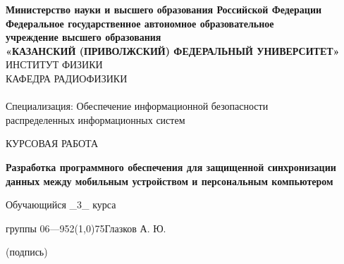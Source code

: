 \documentclass[a4paper]{article}
\begin{document}
\begin{titlepage}
	\newpage
	\begin{center}
		\textbf{\normalsize Министерство науки и высшего образования Российской Федерации
			\vspace{2pt}\\
			Федеральное государственное автономное образовательное
			\vspace{2pt}\\
			учреждение высшего образования
			\vspace{2pt}\\
		«КАЗАНСКИЙ (ПРИВОЛЖСКИЙ) ФЕДЕРАЛЬНЫЙ УНИВЕРСИТЕТ»\\}
		\vspace{26pt}
		\large{ИНСТИТУТ ФИЗИКИ}
		\vspace{2pt}\\
		\large{КАФЕДРА РАДИОФИЗИКИ}\\
		
		\vspace{12pt}{
		Направление подготовки:\\
		10.05.03 – Информационная безопасность автоматизированных систем}
		\vspace{14pt}\\
		
		Специализация: Обеспечение информационной безопасности
		\vspace{-2pt}\\
		распределенных информационных систем
		
		\vspace{63pt}
		КУРСОВАЯ РАБОТА
		
		\vspace{21pt}
		\Large\textbf{Разработка программного обеспечения для защищенной синхронизации данных
		между мобильным устройством и персональным компьютером}
		\end{center}	
	
	\vspace{88pt}
	
	\large{Обучающийся \_3\_ курса}
	\vspace{9pt}
	
	\large{группы 06---952\qquad\qquad\qquad\quad\qquad\quad\;\!\!\!\!\!\!\qquad\qquad\line(1,0){75}\quad Глазков А. Ю.}
	
	\tiny{\qquad\qquad\qquad\qquad\qquad\qquad\qquad\qquad\qquad\quad\quad\!\quad\qquad\qquad\qquad\qquad\qquad\qquad\qquad\qquad\quad\quad\qquad(подпись)}
	
	\vspace{-3pt}
	

\end{titlepage}
\end{document}
